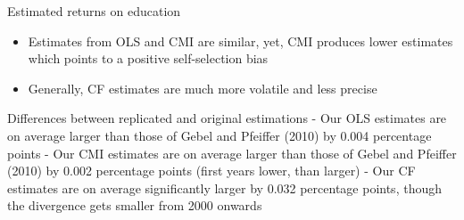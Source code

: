 \documentclass[10pt,ignorenonframetext,]{beamer}
\providecommand{\tightlist}{%
  \setlength{\itemsep}{0pt}\setlength{\parskip}{0pt}}
\begin{document}
\begin{frame}{Estimated returns on education}
\protect\hypertarget{estimated-returns-on-education}{}

\begin{itemize}
\tightlist
\item
  Estimates from OLS and CMI are similar, yet, CMI produces lower
  estimates which points to a positive self-selection bias
\item
  Generally, CF estimates are much more volatile and less precise
\end{itemize}

Differences between replicated and original estimations - Our OLS
estimates are on average larger than those of Gebel and Pfeiffer (2010)
by 0.004 percentage points - Our CMI estimates are on average larger
than those of Gebel and Pfeiffer (2010) by 0.002 percentage points
(first years lower, than larger) - Our CF estimates are on average
significantly larger by 0.032 percentage points, though the divergence
gets smaller from 2000 onwards

\end{frame}
\end{document}
